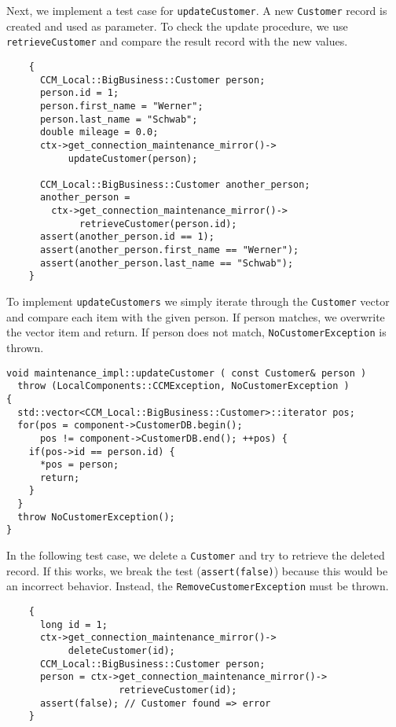 Next, we implement a test case for {\tt updateCustomer}.
A new {\tt Customer} record is created and used as parameter.
To check the update procedure, we use {\tt retrieveCustomer} 
and compare the result record with the new values.

\begin{small}
\begin{verbatim}
    {
      CCM_Local::BigBusiness::Customer person;
      person.id = 1;
      person.first_name = "Werner";
      person.last_name = "Schwab";
      double mileage = 0.0;
      ctx->get_connection_maintenance_mirror()->
           updateCustomer(person);      

      CCM_Local::BigBusiness::Customer another_person;
      another_person = 
        ctx->get_connection_maintenance_mirror()->
             retrieveCustomer(person.id);
      assert(another_person.id == 1);
      assert(another_person.first_name == "Werner");
      assert(another_person.last_name == "Schwab");
    }
\end{verbatim}
\end{small}



To implement {\tt updateCustomers} we simply iterate through the {\tt Customer}
vector and compare each item with the given person.
If person matches, we overwrite the vector item and return.
If person does not match, {\tt NoCustomerException} is thrown.

\begin{small}
\begin{verbatim}
void maintenance_impl::updateCustomer ( const Customer& person )
  throw (LocalComponents::CCMException, NoCustomerException )
{
  std::vector<CCM_Local::BigBusiness::Customer>::iterator pos;
  for(pos = component->CustomerDB.begin(); 
      pos != component->CustomerDB.end(); ++pos) {
    if(pos->id == person.id) {
      *pos = person;
      return;
    }
  }
  throw NoCustomerException();  
}
\end{verbatim}
\end{small}


In the following test case, we delete a {\tt Customer} and try to retrieve the 
deleted record.
If this works, we break the test ({\tt assert(false)}) because this would be an
incorrect behavior. 
Instead, the {\tt RemoveCustomerException} must be thrown.
\begin{small}
\begin{verbatim}
    {
      long id = 1;
      ctx->get_connection_maintenance_mirror()->
           deleteCustomer(id);
      CCM_Local::BigBusiness::Customer person;
      person = ctx->get_connection_maintenance_mirror()->
                    retrieveCustomer(id);
      assert(false); // Customer found => error
    }
\end{verbatim}
\end{small}

